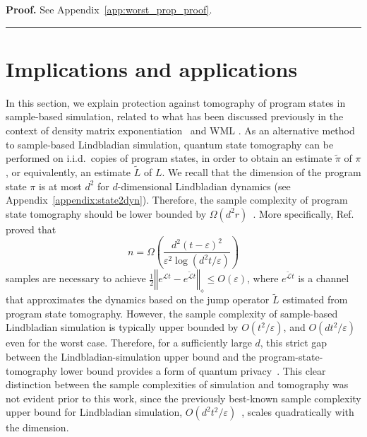 \documentclass[superscriptaddress,amsmath,amssymb,aps,pra,letterpaper,tightenlines,notitlepages,12pt]{revtex4-2}
\newenvironment{proof}[1][Proof]{\noindent\textbf{#1.} }{\ \rule{0.5em}{0.5em}}
\begin{document}
\begin{proof}
See Appendix~\ref{app:worst_prop_proof}.
\end{proof}


\section{Implications and applications} \label{sec:implication}
In this section, we explain protection against tomography of program states in sample-based simulation, related to what has been discussed previously in the context of density matrix exponentiation~\cite{kimmel2017HamiltonianSimulationOptimal} and WML \cite{patel2023WaveMatrixLindbladization, patel2023WaveMatrixLindbladizationa}. As an alternative method to sample-based Lindbladian simulation, quantum state tomography can be performed on i.i.d.~copies of program states, in order to obtain an estimate $\widetilde{\pi}$ of $\pi$, or equivalently, an estimate $\widetilde L$ of $L$. We recall that the dimension of the program state $\pi$ is at most $d^2$ for $d$-dimensional Lindbladian dynamics (see Appendix~\ref{appendix:state2dyn}). Therefore, the sample complexity of program state tomography should be lower bounded by $\Omega(d^2r)$~\cite{haah2016SampleoptimalTomographyQuantum, haah2017SampleoptimalTomographyQuantum, yuen2023ImprovedSampleComplexity}. More specifically, Ref.~\cite[Eq. (2.84)]{patel2023WaveMatrixLindbladizationa} proved that 
\begin{equation}
    n=\Omega\left(\frac{d^2(t-\varepsilon)^2}{\varepsilon^2\log(d^2t/\varepsilon)}\right)
\end{equation}
samples are necessary to achieve $\frac{1}{2}\left\Vert e^{\mathcal{L}t} - e^{\widetilde{\mathcal{L}}t}\right\Vert_\diamond\leq O(\varepsilon)$, where $e^{\widetilde{\mathcal{L}}t}$ is a channel that approximates the dynamics based on the jump operator $\tilde L$ estimated from program state tomography. However, the sample complexity of sample-based Lindbladian simulation is typically upper bounded by $O(t^2/\varepsilon)$, and $O(dt^2/\varepsilon)$ even for the worst case. Therefore, for a sufficiently large $d$, this strict gap between the Lindbladian-simulation upper bound and the program-state-tomography lower bound provides a form of quantum privacy~\cite{aaronson2009QuantumCopyProtectionQuantum, patel2023WaveMatrixLindbladizationa}. This clear distinction between the sample complexities of simulation and tomography was not evident prior to this work, since the previously best-known sample complexity upper bound for Lindbladian simulation, $O(d^2t^2/\varepsilon)$~\cite{go2025SamplebasedHamiltonianLindbladian}, scales quadratically with the dimension.
\end{document}
